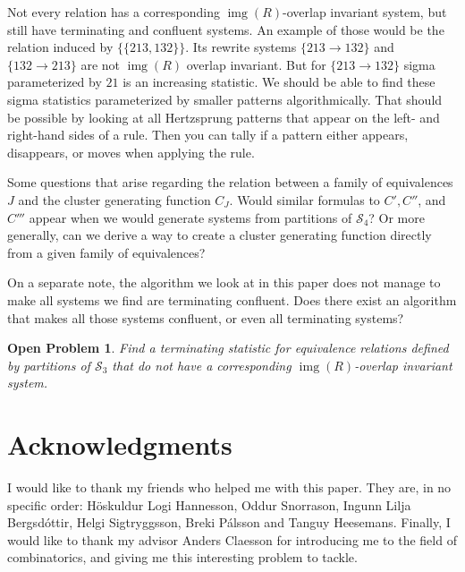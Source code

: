 \documentclass[a4paper, 11pt, english]{article}
\newcommand{\patternrule}{ \to \!}
\newtheorem{openproblem}[theorem]{Open Problem}
\theoremstyle{definition}
\newcommand{\Sym}{\mathcal{S}}
\DeclareMathOperator{\img}{img}
\begin{document}
Not every relation has a corresponding $\img(R)$-overlap invariant system, but still have terminating and
confluent systems. An example of those would be the relation induced by $\{ \{ 213, 132
\} \}$. Its rewrite systems ${\{ 213 \patternrule 132 \}}$ and ${\{
132 \patternrule 213 \}}$ are not $\img(R)$ overlap invariant. 
But for $\{ 213 \patternrule 132 \}$ sigma parameterized by $21$ is an increasing statistic. We
should be able to find these sigma statistics parameterized by smaller patterns algorithmically.
That should be possible by looking at all Hertzsprung patterns that appear on the left- and right-hand
sides of a rule. Then you can tally if a pattern either appears, disappears, or moves when applying the rule.

Some questions that arise regarding the relation between a family of equivalences $J$ and
the cluster generating function $C_J$.
Would similar formulas to $C', C''$, and $C'''$ appear when we would
generate systems from partitions of $\Sym_4$? 
Or more generally, 
can we derive a way to create a cluster generating function directly from a
given family of equivalences? 

On a separate note, the algorithm we look at in this paper does not manage to make all systems
we find are terminating confluent. Does there exist an algorithm that makes all those systems
confluent, or even all terminating systems?

\begin{openproblem}
    Find a terminating statistic for equivalence relations
    defined by partitions of $\Sym_3$ that do not have a corresponding $\img(R)$-overlap invariant system.
\end{openproblem}

\section*{Acknowledgments}
I would like to thank my friends who helped me with this paper. They are, in no specific order: Höskuldur
Logi Hannesson, Oddur Snorrason, Ingunn Lilja Bergsdóttir, Helgi Sigtryggsson, Breki Pálsson and
Tanguy Heesemans. Finally, I would like to thank my advisor Anders Claesson for introducing me to the
field of combinatorics, and giving me this interesting problem to tackle.

\clearpage




\clearpage
\end{document}
